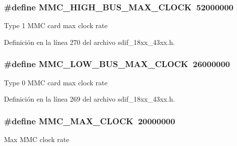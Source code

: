 \subsubsection[{\texorpdfstring{M\+M\+C\+\_\+\+H\+I\+G\+H\+\_\+\+B\+U\+S\+\_\+\+M\+A\+X\+\_\+\+C\+L\+O\+CK}{MMC_HIGH_BUS_MAX_CLOCK}}]{\setlength{\rightskip}{0pt plus 5cm}\#define M\+M\+C\+\_\+\+H\+I\+G\+H\+\_\+\+B\+U\+S\+\_\+\+M\+A\+X\+\_\+\+C\+L\+O\+CK~52000000}\hypertarget{group___s_d_i_f__18_x_x__43_x_x_gaa5cd31be8a759d4fb47a1b46fc5350c3}{}\label{group___s_d_i_f__18_x_x__43_x_x_gaa5cd31be8a759d4fb47a1b46fc5350c3}
Type 1 M\+MC card max clock rate 

Definición en la línea 270 del archivo sdif\+\_\+18xx\+\_\+43xx.\+h.

\subsubsection[{\texorpdfstring{M\+M\+C\+\_\+\+L\+O\+W\+\_\+\+B\+U\+S\+\_\+\+M\+A\+X\+\_\+\+C\+L\+O\+CK}{MMC_LOW_BUS_MAX_CLOCK}}]{\setlength{\rightskip}{0pt plus 5cm}\#define M\+M\+C\+\_\+\+L\+O\+W\+\_\+\+B\+U\+S\+\_\+\+M\+A\+X\+\_\+\+C\+L\+O\+CK~26000000}\hypertarget{group___s_d_i_f__18_x_x__43_x_x_ga65bf7243fd919508d7d7b9ac358269cf}{}\label{group___s_d_i_f__18_x_x__43_x_x_ga65bf7243fd919508d7d7b9ac358269cf}
Type 0 M\+MC card max clock rate 

Definición en la línea 269 del archivo sdif\+\_\+18xx\+\_\+43xx.\+h.

\subsubsection[{\texorpdfstring{M\+M\+C\+\_\+\+M\+A\+X\+\_\+\+C\+L\+O\+CK}{MMC_MAX_CLOCK}}]{\setlength{\rightskip}{0pt plus 5cm}\#define M\+M\+C\+\_\+\+M\+A\+X\+\_\+\+C\+L\+O\+CK~20000000}\hypertarget{group___s_d_i_f__18_x_x__43_x_x_ga6efbc115fac65c191a0bb3cc9b90ad59}{}\label{group___s_d_i_f__18_x_x__43_x_x_ga6efbc115fac65c191a0bb3cc9b90ad59}
Max M\+MC clock rate 


